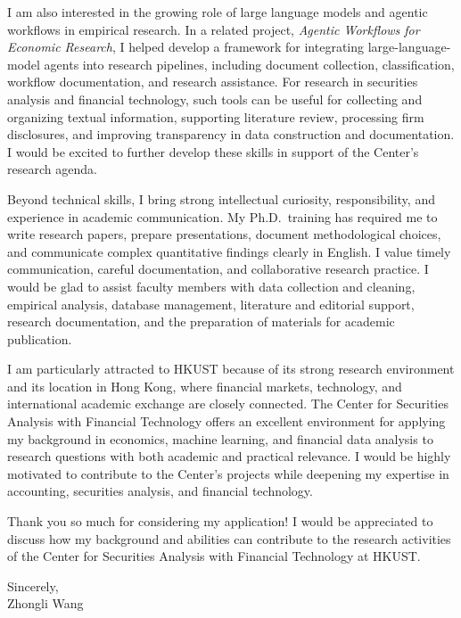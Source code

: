 \documentclass[11pt]{article}
\begin{document}
I am also interested in the growing role of large language models and agentic workflows in empirical research. In a related project, \emph{Agentic Workflows for Economic Research}, I helped develop a framework for integrating large-language-model agents into research pipelines, including document collection, classification, workflow documentation, and research assistance. For research in securities analysis and financial technology, such tools can be useful for collecting and organizing textual information, supporting literature review, processing firm disclosures, and improving transparency in data construction and documentation. I would be excited to further develop these skills in support of the Center's research agenda.

Beyond technical skills, I bring strong intellectual curiosity, responsibility, and experience in academic communication. My Ph.D.\ training has required me to write research papers, prepare presentations, document methodological choices, and communicate complex quantitative findings clearly in English. I value timely communication, careful documentation, and collaborative research practice. I would be glad to assist faculty members with data collection and cleaning, empirical analysis, database management, literature and editorial support, research documentation, and the preparation of materials for academic publication.

I am particularly attracted to HKUST because of its strong research environment and its location in Hong Kong, where financial markets, technology, and international academic exchange are closely connected. The Center for Securities Analysis with Financial Technology offers an excellent environment for applying my background in economics, machine learning, and financial data analysis to research questions with both academic and practical relevance. I would be highly motivated to contribute to the Center's projects while deepening my expertise in accounting, securities analysis, and financial technology.

Thank you so much for considering my application! I would be appreciated to discuss how my background and abilities can contribute to the research activities of the Center for Securities Analysis with Financial Technology at HKUST.

\vspace{0.15cm}

\noindent Sincerely, \\[0.8cm]
\noindent Zhongli Wang
\end{document}
